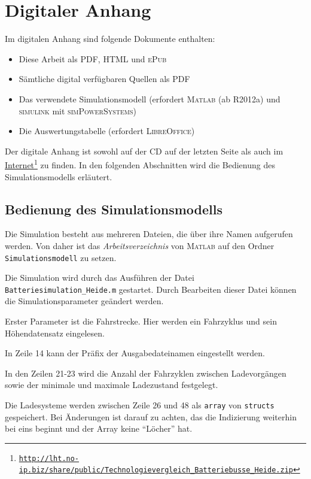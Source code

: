
\chapter{Digitaler Anhang}
\label{an_Digital}
Im digitalen Anhang sind folgende Dokumente enthalten:
\begin{itemize}
	\item Diese Arbeit als \textsc{PDF}, \textsc{HTML} und \textsc{ePub}
	\item Sämtliche digital verfügbaren Quellen als PDF
	\item Das verwendete Simulationsmodell (erfordert \textsc{Matlab} (ab R2012a) und \textsc{simulink} mit \textsc{simPowerSystems})
	\item Die Auswertungstabelle (erfordert \textsc{LibreOffice})
\end{itemize}

Der digitale Anhang ist sowohl auf der CD auf der letzten Seite als auch im \href{http://lht.no-ip.biz/share/public/Technologievergleich\_Batteriebusse\_Heide.zip}{Internet}\footnote{\href{http://lht.no-ip.biz/share/public/Technologievergleich\_Batteriebusse\_Heide.zip}{\texttt{http://lht.no-ip.biz/share/public/Technologievergleich\_Batteriebusse\_Heide.zip}}} zu finden. In den folgenden Abschnitten wird die Bedienung des Simulationsmodells erläutert.

\section{Bedienung des Simulationsmodells}
Die Simulation besteht aus mehreren Dateien, die über ihre Namen aufgerufen werden. Von daher ist das \emph{Arbeitsverzeichnis} von \textsc{Matlab} auf den Ordner \texttt{Simulationsmodell} zu setzen.

Die Simulation wird durch das Ausführen der Datei \texttt{Batteriesimulation\_Heide.m} gestartet. Durch Bearbeiten dieser Datei können die Simulationsparameter geändert werden.

Erster Parameter ist die Fahrstrecke. Hier werden ein Fahrzyklus und sein Höhendatensatz eingelesen.

In Zeile 14 kann der Präfix der Ausgabedateinamen eingestellt werden.

In den Zeilen 21-23 wird die Anzahl der Fahrzyklen zwischen Ladevorgängen sowie der minimale und maximale Ladezustand festgelegt.

Die Ladesysteme werden zwischen Zeile 26 und 48 als \texttt{array} von \texttt{structs} gespeichert. Bei Änderungen ist darauf zu achten, das die Indizierung weiterhin bei eins beginnt und der Array keine "`Löcher"' hat.

